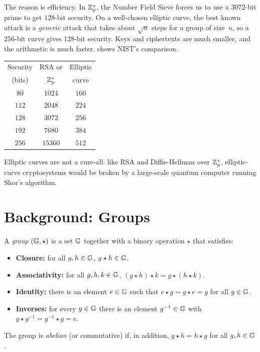The reason is efficiency.
In $\mathbb{Z}^*_p$, the Number Field Sieve forces us to use a $3072$-bit prime
to get $128$-bit security.
On a well-chosen elliptic curve, the best known attack is a
\emph{generic} attack that takes about $\sqrt{n}$ steps for a group of
size~$n$, so a $256$-bit curve gives $128$-bit security.
Keys and ciphertexts are much smaller, and the arithmetic is much faster.
 shows NIST's comparison.\autocite{NIST80057}

\begin{margintable}
\centering\small
\begin{tabular}{ccc}
\hline
Security & RSA or     & Elliptic \\
(bits)   & $\mathbb{Z}^*_p$  & curve \\
\hline
$80$  & $1024$  & $160$ \\
$112$ & $2048$  & $224$ \\
$128$ & $3072$  & $256$ \\
$192$ & $7680$  & $384$ \\
$256$ & $15360$ & $512$ \\
\hline
\end{tabular}
\caption{Comparable key sizes in bits, from NIST's key-management
guidelines.}
\label{tab:ecc-keysizes}
\end{margintable}

Elliptic curves are not a cure-all: like RSA and Diffie-Hellman
over $\mathbb{Z}^*_p$, elliptic-curve cryptosystems would be broken by a
large-scale quantum computer running Shor's algorithm.

\section{Background: Groups}

\begin{definition}[Group]
A \emph{group} $(\mathbb{G}, \star)$ is a set $\mathbb{G}$ together with a binary
operation $\star$ that satisfies:
\begin{itemize}[noitemsep]
  \item \textbf{Closure:} for all $g, h \in \mathbb{G}$, $g \star h \in \mathbb{G}$.
  \item \textbf{Associativity:} for all $g, h, k \in \mathbb{G}$,
        $(g \star h) \star k = g \star (h \star k)$.
  \item \textbf{Identity:} there is an element $e \in \mathbb{G}$ such that
        $e \star g = g \star e = g$ for all $g \in \mathbb{G}$.
  \item \textbf{Inverses:} for every $g \in \mathbb{G}$ there is an element
        $g^{-1} \in \mathbb{G}$ with $g \star g^{-1} = g^{-1} \star g = e$.
\end{itemize}
The group is \emph{abelian} (or commutative) if, in addition,
$g \star h = h \star g$ for all $g, h \in \mathbb{G}$.
\end{definition}

